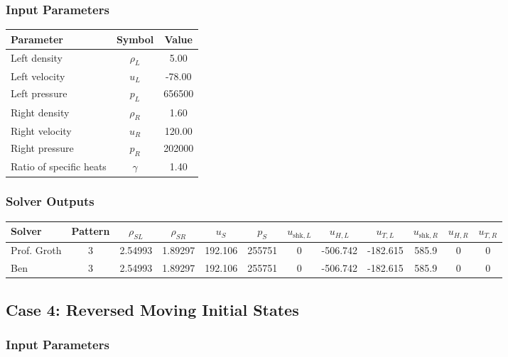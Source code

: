 \documentclass[11pt,landscape]{article}
\begin{document}
\subsubsection*{Input Parameters}

\begin{center}
\begin{tabular}{lcc}
\toprule
Parameter & Symbol & Value \\
\midrule
Left density & $\rho_L$ & 5.00 \\
Left velocity & $u_L$ & -78.00 \\
Left pressure & $p_L$ & 656500 \\
Right density & $\rho_R$ & 1.60 \\
Right velocity & $u_R$ & 120.00 \\
Right pressure & $p_R$ & 202000 \\
Ratio of specific heats & $\gamma$ & 1.40 \\
\bottomrule
\end{tabular}
\end{center}

\subsubsection*{Solver Outputs}

\begin{center}
\small
\begin{tabular}{lccccccccccc}
\toprule
Solver & Pattern & $\rho_{SL}$ & $\rho_{SR}$ & $u_S$ & $p_S$
& $u_{\mathrm{shk},L}$ & $u_{H,L}$ & $u_{T,L}$
& $u_{\mathrm{shk},R}$ & $u_{H,R}$ & $u_{T,R}$ \\
\midrule
Prof. Groth & 3 & 2.54993 & 1.89297 & 192.106 & 255751
& 0 & -506.742 & -182.615 & 585.9 & 0 & 0 \\

Ben & 3 & 2.54993 & 1.89297 & 192.106 & 255751
& 0 & -506.742 & -182.615 & 585.9 & 0 & 0 \\
\bottomrule
\end{tabular}
\end{center}

\subsection*{Case 4: Reversed Moving Initial States}

\subsubsection*{Input Parameters}
\end{document}
